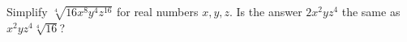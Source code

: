Simplify $\sqrt[4]{16x^8y^4z^{16}}$ for real numbers $x,y,z$. Is the answer $2x^2yz^4$ the same as $x^2yz^4\sqrt[4]{16}$?
